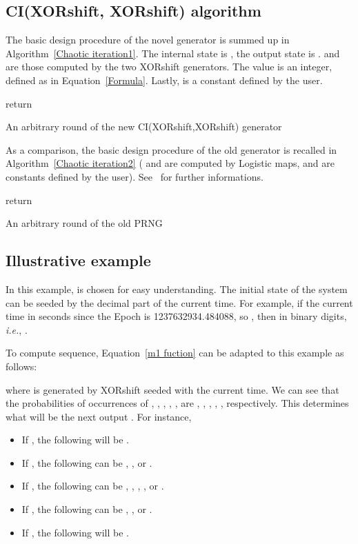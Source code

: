 \documentclass[10pt, a4paper, conference, compsocconf]{IEEEtran}
\begin{document}
\subsection{CI(XORshift, XORshift) algorithm}
The basic design procedure of the novel generator is summed up in Algorithm~\ref{Chaotic iteration1}.
The internal state is , the output state is .  and  are those computed by the two XORshift 
generators. The value  is an integer, defined as in Equation~\ref{Formula}. Lastly,  is a constant defined by the user.
\begin{algorithm}
\SetAlgoLined
{}
\For{}
{
\;
}
\;
\;
\;
\For{}
{
\;
\;
    \If{}
    {
      \;
      \;
    }
    \ElseIf{}
    {
      \;
    }
}
\;
return \;
\medskip
\caption{An arbitrary round of the new CI(XORshift,XORshift) generator}
\label{Chaotic iteration1}
\end{algorithm}

As a comparison, the basic design procedure of the old generator is recalled in Algorithm~\ref{Chaotic iteration2} ( and  are computed by Logistic maps,  and  are constants defined by the user). See~\cite{wang2009} for further informations.

\begin{algorithm}
\SetAlgoLined
{}
\;
    \If{}
      {
      
      }
    \Else
      {
      
      }

\;
\For{}
{
\;
\;
\;
}
\;
return \;
\medskip
\caption{An arbitrary round of the old PRNG}
\label{Chaotic iteration2}
\end{algorithm}



\subsection{Illustrative example}
In this example,  is chosen for easy understanding.
The initial state of the system  can be seeded by the decimal part  of the current time. 
For example, if the current time in seconds since the Epoch is 1237632934.484088, 
so , then  in binary digits, \emph{i.e.}, . 

To compute  sequence, Equation~\ref{m1 fuction} can be adapted to this example as follows:


\noindent where  is generated by XORshift seeded with the current time. We can see that the probabilities of occurrences of , , , , , are , , , , , respectively. This  determines what will be the next output . For instance, 
\begin{itemize}
\item If , the following  will be .
\item If , the following  can be , ,  or .
\item If , the following  can be , , , ,  or .
\item If , the following  can be , ,  or .
\item If , the following  will be .
\end{itemize}
\end{document}
